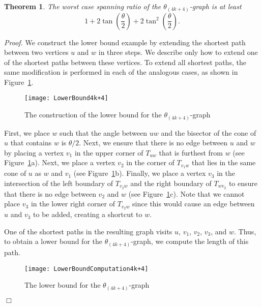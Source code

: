 \documentclass[12pt]{article}
\newtheorem{theo}[defin]{Theorem}
\newenvironment{theorem}{\begin{theo} \sl}{\end{theo}}
\newenvironment{proof}{\emph{Proof.}}{\hfill $\Box$\\}
\newcommand{\graph}[1]{\ensuremath{\theta_{(4 k + #1)}}-graph\xspace}
\newcommand{\canon}[2]{\ensuremath{T_{#1 #2}}}
\begin{document}
\begin{theorem}
  The worst case spanning ratio of the \graph{4} is at least \[1 + 2 \tan \left( \frac{\theta}{2} \right) + 2 \tan^2 \left( \frac{\theta}{2} \right).\] 
\end{theorem}
\begin{proof}
We construct the lower bound example by extending the shortest path between two vertices $u$ and $w$ in three steps. We describe only how to extend one of the shortest paths between these vertices. To extend all shortest paths, the same modification is performed in each of the analogous cases, as shown in Figure~\ref{fig:LowerBound4k+4}. 

\begin{figure}[H]
  \begin{center}
    \texttt{[image: LowerBound4k+4]}
  \end{center}
  \vspace{-1em}
  \caption{The construction of the lower bound for the \graph{4}}
  \label{fig:LowerBound4k+4}
\end{figure}

First, we place $w$ such that the angle between $u w$ and the bisector of the cone of $u$ that contains $w$ is $\theta/2$. Next, we ensure that there is no edge between $u$ and $w$ by placing a vertex $v_1$ in the upper corner of \canon{u}{w} that is furthest from $w$ (see Figure~\ref{fig:LowerBound4k+4}a). Next, we place a vertex $v_2$ in the corner of \canon{v_1}{w} that lies in the same cone of $u$ as $w$ and $v_1$ (see Figure~\ref{fig:LowerBound4k+4}b). Finally, we place a vertex $v_3$ in the intersection of the left boundary of \canon{v_2}{w} and the right boundary of \canon{w}{v_2} to ensure that there is no edge between $v_2$ and $w$ (see Figure~\ref{fig:LowerBound4k+4}c). Note that we cannot place $v_3$ in the lower right corner of \canon{v_2}{w} since this would cause an edge between $u$ and $v_3$ to be added, creating a shortcut to $w$. 

One of the shortest paths in the resulting graph visits $u$, $v_1$, $v_2$, $v_3$, and $w$. Thus, to obtain a lower bound for the \graph{4}, we compute the length of this path. 

\begin{figure}[H]
  \begin{center}
    \texttt{[image: LowerBoundComputation4k+4]}
  \end{center}
  \caption{The lower bound for the \graph{4}}
  \label{fig:LowerBoundComputation4k+4}
\end{figure}


\end{proof}
\end{document}

